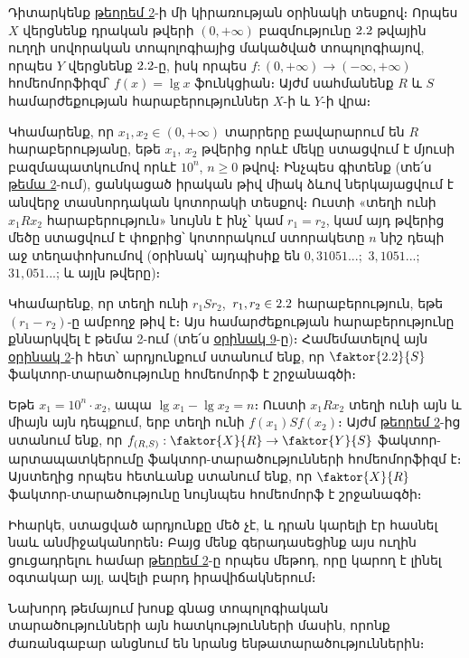 \documentclass[./main.tex]{subfiles}
\begin{document}
\par Դիտարկենք \hyperref[ch12thm2]{թեորեմ 2}-ի մի կիրառության օրինակի տեսքով։ Որպես $X$ վերցնենք դրական թվերի $(0,+\infty)$ բազմությունը $2.2$ թվային ուղղի սովորական տոպոլոգիայից մակածված տոպոլոգիայով, որպես $Y$ վերցնենք $2.2$-ը, իսկ որպես $f: (0, +\infty) \to (-\infty, +\infty)$ հոմեոմորֆիզմ՝ $f(x)=\lg x$ ֆունկցիան։ Այժմ սահմանենք $R$ և $S$ համ\-ար\-ժե\-քու\-թյան հարաբերություններ $X$-ի և $Y$-ի վրա։ 

\par Կհամարենք, որ $x_1, x_2 \in (0, +\infty)$ տարրերը բավարարում են $R$ հարաբերությա\-նը, եթե $x_1$, $x_2$ թվերից որևէ մեկը ստացվում է մյուսի բազմապատկումով որևէ $10^n$, $n \ge 0$ թվով։ Ինչպես գիտենք (տե՛ս \hyperref[sec:2]{թեմա 2}-ում), ցանկացած իրական թիվ միակ ձևով ներկայացվում է անվերջ տասնորդական կոտորակի տեսքով։ Ուստի «տեղի ունի $x_1Rx_2$ հարաբերություն» նույնն է ինչ՝ կամ $r_1=r_2$, կամ այդ թվերից մեծը ստացվում է փոքրից՝ կոտորակում ստորակետը $n$ նիշ դեպի աջ տեղափոխումով (օրինակ՝ այդպիսիք են $0{,}31051...$;\, $3{,}1051...$;\, $31{,}051...$; և այլն թվերը)։

\par Կհամարենք, որ տեղի ունի $r_1 S r_2$,\, $r_1, r_2 \in 2.2$ հարաբերություն, եթե $(r_1 - r_2)$-ը ամբողջ թիվ է։ Այս համարժեքության հարաբերությունը քննարկվել է թեմա 2-ում (տե՛ս \hyperref[ch2ex9]{օրինակ 9}-ը)։ Համեմատելով այն \hyperref[ch12ex2]{օրինակ 2}-ի հետ՝ ար\-դ\-յուն\-քում ստանում ենք, որ $\faktor{\R}{S}$ ֆակտոր-տարածությունը հոմեոմորֆ է շրջանագծի։

\par Եթե $x_1 = 10^n \cdot x_2$, ապա $\lg x_1 - \lg x_2 = n$։ Ուստի $x_1 R x_2$ տեղի ունի այն և միայն այն դեպքում, երբ տեղի ունի $f(x_1) S f(x_2)$։ Այժմ \hyperref[ch12thm2]{թեորեմ 2}-ից ստանում ենք, որ $f_{(R,S)}: \faktor{X}{R} \to \faktor{Y}{S}$ ֆակտոր-արտապատկերումը ֆակտոր-տարածությունների հոմեոմորֆիզմ է։ Այստեղից որպես հետևանք ստանում ենք, որ $\faktor{X}{R}$ ֆակտոր-տարածությունը նույնպես հոմեոմորֆ է շրջանագծի։

\par Իհարկե, ստացված արդյունքը մեծ չէ, և դրան կարելի էր հասնել նաև անմի\-ջա\-կա\-նո\-րեն։ Բայց մենք գերադասեցինք այս ուղին ցուցադրելու համար \hyperref[ch12thm2]{թեո\-րեմ 2}-ը որպես մեթոդ, որը կարող է լինել օգտակար այլ, ավելի բարդ իրավի\-ճակ\-նե\-րում։

\par Նախորդ թեմայում խոսք գնաց տոպոլոգիական տարածությունների այն հատ\-կու\-թյունների մասին, որոնք ժառանգաբար անցնում են նրանց ենթատարածու\-թյուն\-նե\-րին։
\end{document}
